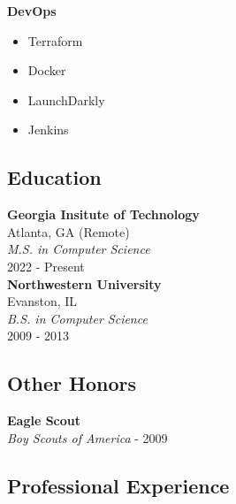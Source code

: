 \documentclass[10pt]{article}
\begin{document}
\begin{paracol}{2}
    \noindent \textbf{DevOps}
    \begin{itemize}
        \item Terraform
        \item Docker
        \item LaunchDarkly
        \item Jenkins
    \end{itemize}

    \subsection*{Education}
    \textbf{Georgia Insitute of Technology} \\
    Atlanta, GA (Remote) \\
    \textit{M.S. in Computer Science}  \\
    {\footnotesize{2022 - Present}} \\


    \noindent \textbf{Northwestern University} \\
    Evanston, IL \\
    \textit{B.S. in Computer Science}  \\
    {\footnotesize{2009 - 2013}}

    \subsection*{Other Honors}
    \textbf{Eagle Scout} \\
    \textit{Boy Scouts of America} - {\footnotesize{2009}}

    \switchcolumn

    \subsection*{Professional Experience}


\end{paracol}
\end{document}
